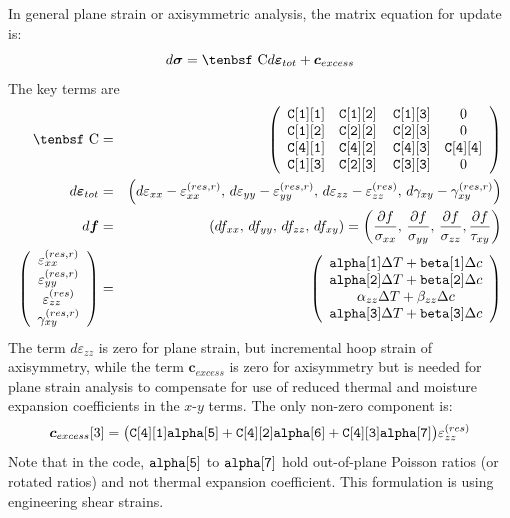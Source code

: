 \documentclass[11pt]{book}
\renewcommand{\vec}[1]{\boldsymbol{#1}}
\def\a#1{\alpha_{#1}}
\def\b#1{\beta_{#1}}
\def\C{\hbox{\tenbsf C}}
\def\cex{\vec{c}_{excess}}
\def\code#1{{\small\tt #1}}
\def\deff{d \vec{\varepsilon}_{tot}}
\def\df{d \vec{f}}
\def\dsig{d \vec{\sigma}}
\def\DT{\Delta T}
\def\e#1{\varepsilon_{#1}}
\def\er#1{\varepsilon_{#1}^{(res)}}
\def\err#1{\varepsilon_{#1}^{(res,r)}}
\def\g#1{\gamma_{#1}}
\begin{document}
In general plane strain or axisymmetric analysis, the matrix equation for update is:
\begin{equation}
    \dsig = \C \deff +\cex
\end{equation}
The key terms are
\begin{eqnarray}
      \C & = & \left(\begin{array}{cccc} \code{C[1][1]}  & \code{C[1][2]}  & \thinspace\code{C[1][3]}  & 0   \\
                    \code{C[1][2]}  & \code{C[2][2]}  & \thinspace\code{C[2][3]}  & 0 \\
                            \code{C[4][1]}  & \code{C[4][2]}  & \thinspace\code{C[4][3]}  & \code{C[4][4]}  \\
                 \code{C[1][3]}  & \code{C[2][3]}  & \thinspace\code{C[3][3]}  & 0 \end{array}\right)  \\
      \deff & = & \left(d\e{xx} - \err{xx}, \thinspace d\e{yy} - \err{yy}, \thinspace d\e{zz} -  \er{zz}, 
              \thinspace d\g{xy}-\gamma_{xy}^{(res,r)}\right) \\
      \df & = & (df_{xx}, \thinspace df_{yy}, \thinspace df_{zz}, \thinspace df_{xy})
                  = \left({\partial f\over \sigma_{xx}}, \thinspace {\partial f\over \sigma_{yy}}, \thinspace {\partial f\over \sigma_{zz}},
                                {\partial f\over \tau_{xy}}\right)  \\
\left(\begin{array}{c} \err{xx} \\ \err{yy} \\ \er{zz} \\ \gamma_{xy}^{(res,r)} \end{array}\right)
       & = &  \left(\begin{array}{c}
	\code{alpha[1]}\DT + \code{beta[1]}\Delta c \\
	\code{alpha[2]}\DT + \code{beta[2]}\Delta c \\
	\a{zz}\DT + \b{zz}\Delta c \\
	\code{alpha[3]}\DT + \code{beta[3]}\Delta c  \end{array}\right) 
 \end{eqnarray}
The term $d\e{zz}$ is zero for plane strain, but incremental hoop strain of axisymmetry, while the term $\cex$ is zero for axisymmetry but is needed for plane strain analysis to compensate for use of reduced thermal and moisture expansion coefficients in the $x$-$y$ terms. The only non-zero component is:
\begin{equation}
      \cex[3] = \bigl(\code{C[4][1]}\code{alpha[5]}
              + \code{C[4][2]}\code{alpha[6]}+\code{C[4][3]}\code{alpha[7]}\bigr)\er{zz} 
\end{equation}
Note that in the code, $\code{alpha[5]}$ to $\code{alpha[7]}$ hold out-of-plane Poisson ratios (or rotated ratios) and not thermal expansion coefficient.
This formulation is using engineering shear strains. 
 
\end{document}
